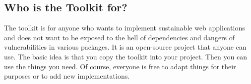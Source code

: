 \subsection{Who is the Toolkit for?}
\label{sub:Who is the Toolkit for?}
The toolkit is for anyone who wants to implement sustainable web applications 
and does not want to be exposed to the hell of dependencies and dangers
of vulnerabilities in various packages. It is an open-source project that
anyone can use. The basic idea is that you copy the toolkit into your project.
Then you can use the things you need. Of course, everyone is free to adapt
things for their purposes or to add new implementations.
